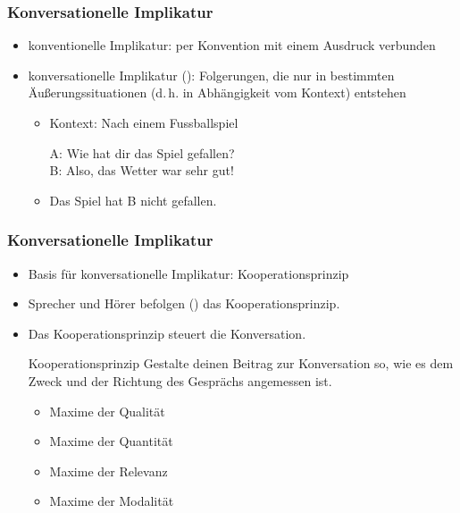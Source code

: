 
\begin{frame}
\frametitle{Konversationelle Implikatur}

\begin{itemize}
	\item konventionelle Implikatur: per Konvention mit einem Ausdruck verbunden
	\medskip
	\item konversationelle Implikatur (\implc ):
Folgerungen, die nur in bestimmten Äu\ss{}erungssituationen (d.\,h. in Abhängigkeit vom Kontext) entstehen

\vspace{5mm}

	\begin{itemize}
		\item Kontext: Nach einem Fussballspiel
		
		\ea A: Wie hat dir das Spiel gefallen?\\ B: Also, das Wetter war sehr gut!\\
		\item[] \implc Das Spiel hat B nicht gefallen.
		\z
	\end{itemize}
	
\end{itemize}

\end{frame}



\begin{frame}
\frametitle{Konversationelle Implikatur}

\begin{itemize}
	\item Basis für konversationelle Implikatur: Kooperationsprinzip
	\medskip
	\item Sprecher und Hörer befolgen (\idR) das Kooperationsprinzip.
	\item Das Kooperationsprinzip steuert die Konversation.
	
	\medskip
	
	\begin{block}{Kooperationsprinzip}
		Gestalte deinen Beitrag zur Konversation so, wie es dem Zweck und der Richtung des Gesprächs angemessen ist.
		
		\begin{itemize}
			\item Maxime der Qualität
			\item Maxime der Quantität
			\item Maxime der Relevanz
			\item Maxime der Modalität
		\end{itemize}
	
	\end{block}
	
\end{itemize}

\end{frame}


